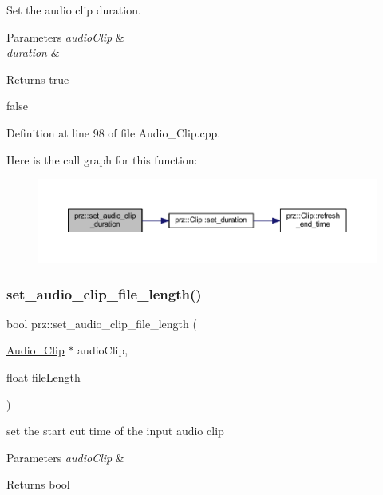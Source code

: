 Set the audio clip duration. 


\begin{DoxyParams}{Parameters}
{\em audio\+Clip} & \\
\hline
{\em duration} & \\
\hline
\end{DoxyParams}
\begin{DoxyReturn}{Returns}
true 

false 
\end{DoxyReturn}


Definition at line 98 of file Audio\+\_\+\+Clip.\+cpp.

Here is the call graph for this function\+:
\nopagebreak
\begin{figure}[H]
\begin{center}
\leavevmode
\includegraphics[width=350pt]{namespaceprz_a6f3d46bb8898e0ab0f8200ff01e68b83_cgraph}
\end{center}
\end{figure}
\mbox{\label{namespaceprz_a9722a82e0324e8ddf5fa0923298a8797}} 
\subsubsection{\texorpdfstring{set\_audio\_clip\_file\_length()}{set\_audio\_clip\_file\_length()}}
{\footnotesize\ttfamily bool prz\+::set\+\_\+audio\+\_\+clip\+\_\+file\+\_\+length (\begin{DoxyParamCaption}\item[{\mbox{\hyperlink{classprz_1_1_audio___clip}{Audio\+\_\+\+Clip}} $\ast$}]{audio\+Clip,  }\item[{float}]{file\+Length }\end{DoxyParamCaption})}



set the start cut time of the input audio clip 


\begin{DoxyParams}{Parameters}
{\em audio\+Clip} & \\
\hline
\end{DoxyParams}
\begin{DoxyReturn}{Returns}
bool 
\end{DoxyReturn}



